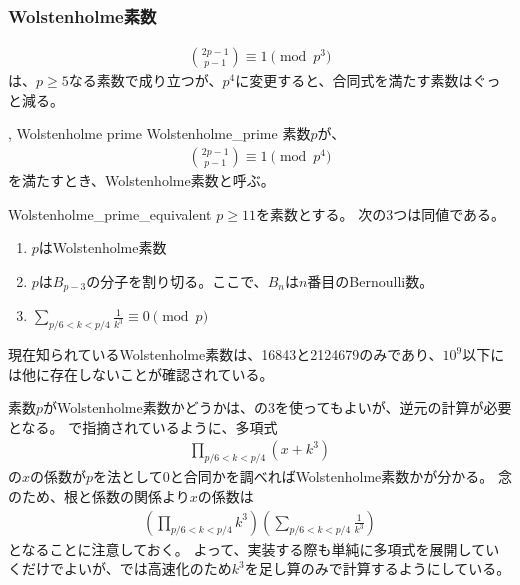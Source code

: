 \subsubsection{Wolstenholme素数}

\begin{align*}
{2p-1 \choose p-1} \equiv 1 \pmod{p^3}
\end{align*}
は、$p\ge5$なる素数で成り立つが、$p^4$に変更すると、合同式を満たす素数はぐっと減る。

\begin{Defi}{, Wolstenholme prime \cite{RichardJ1995}}{Wolstenholme_prime}
素数$p$が、
\begin{align*}
{2p-1 \choose p-1} \equiv 1 \pmod{p^4}
\end{align*}
を満たすとき、Wolstenholme素数と呼ぶ。
\end{Defi}

\begin{Theo}{\cite{RichardJ1995}}{Wolstenholme_prime_equivalent}
$p\ge11$を素数とする。
次の3つは同値である。
\begin{enumerate}
 \item $p$はWolstenholme素数
 \item $p$は$B_{p-3}$の分子を割り切る。ここで、$B_n$は$n$番目のBernoulli数。
 \item $\sum_{p/6<k<p/4}\frac{1}{k^3} \equiv 0 \pmod{p}$
\end{enumerate}
\end{Theo}

現在知られているWolstenholme素数は、16843と2124679のみであり、$10^9$以下には他に存在しないことが確認されている\cite{McIntosh2007ASF}。

素数$p$がWolstenholme素数かどうかは、の3を使ってもよいが、逆元の計算が必要となる。
\cite{McIntosh2007ASF}で指摘されているように、多項式
\begin{align*}
\prod_{p/6<k<p/4} (x+k^3)
\end{align*}
の$x$の係数が$p$を法として0と合同かを調べればWolstenholme素数かが分かる。
念のため、根と係数の関係より$x$の係数は
\begin{align*}
\left(\prod_{p/6<k<p/4}k^3\right)\left(\sum_{p/6<k<p/4}\frac{1}{k^3}\right)
\end{align*}
となることに注意しておく。
よって、実装する際も単純に多項式を展開していくだけでよいが、では高速化のため$k^3$を足し算のみで計算するようにしている。

